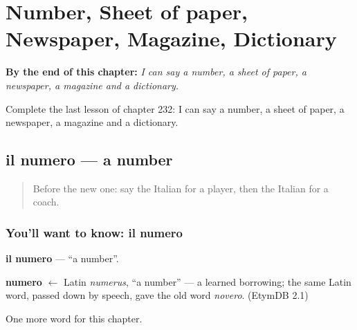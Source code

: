 
\chapter{Number, Sheet of paper, Newspaper, Magazine, Dictionary}
\label{ch:it-number-sheet-of-paper-newspaper-magazine-dictionary}

\begin{chapteropening}
\textbf{By the end of this chapter:} \emph{I can say a number, a sheet of paper, a newspaper, a magazine and a dictionary.}

Complete the last lesson of chapter 232: I can say a number, a sheet of paper, a newspaper, a magazine and a dictionary.
\end{chapteropening}

\section[il numero]{il numero — a number}

\label{lesson:IT-C232-numero}



\begin{quote}
Before the new one: say the Italian for a player, then the Italian for a coach.
\end{quote}

\subsection*{You'll want to know: il numero}
\textbf{il numero} — \textquotedblleft{}a number\textquotedblright{}.

\begin{cousinweb}
\textbf{numero} $\leftarrow$ Latin \emph{numerus}, \textquotedblleft{}a number\textquotedblright{} — a learned borrowing; the same Latin word, passed down by speech, gave the old word \emph{novero}. (EtymDB 2.1)
\end{cousinweb}

\begin{grammarlens}[title={What you've built}]
One more word for this chapter.
\end{grammarlens}

